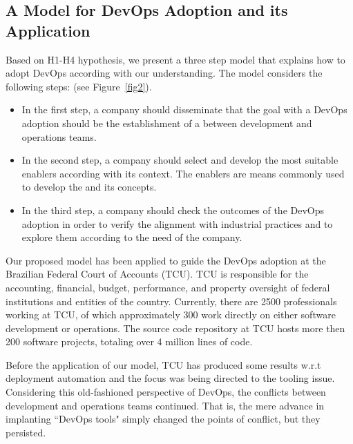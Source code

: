 \subsection{A Model for DevOps Adoption and its Application}\label{sec:case_study}

Based on H1-H4 hypothesis, we present a three step model that
explains how to adopt DevOps according with our understanding. The 
model considers the following steps: 
(see Figure~\ref{fig2}).

\begin{itemize}
\item In the first step, a company should
disseminate that the goal with a DevOps adoption should be
the establishment of a  between
development and operations teams.

\item In the second step, a company should select and develop
the most suitable enablers according with its context. The enablers
are means commonly used to develop the 
and its concepts.

\item In the third step, a company should check the outcomes of the
DevOps adoption in order to verify the alignment with
industrial practices and to explore them according to the
need of the company.
\end{itemize}



Our proposed model has been applied to guide the DevOps adoption at the Brazilian Federal Court of
Accounts (TCU). TCU is responsible for the accounting, financial, budget, performance, and property
oversight of federal institutions and entities of the country. Currently, there are 2500 
professionals working at TCU, of which approximately 300 work directly on either 
software development or operations. The source code repository at TCU hosts more then 200 software projects, totaling
over 4 million lines of code.

Before the application of our model, TCU has produced some results w.r.t deployment
automation and the focus was being directed to the tooling issue. Considering this 
old-fashioned perspective of DevOps, the conflicts between development and operations 
teams continued. That is, the mere advance in implanting ``DevOps tools" simply 
changed the points of conflict, but they persisted.


